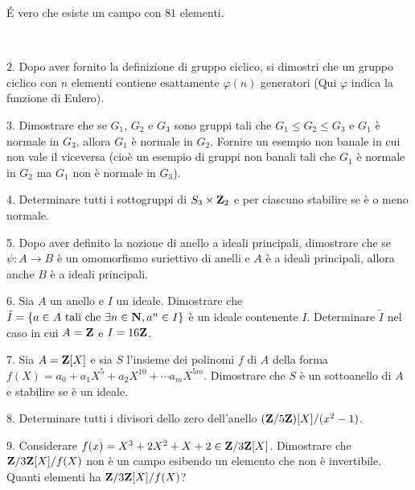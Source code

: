  \'E vero che esiste un campo con $81$ elementi.\medskip\bigskip\bigskip

\ \dotfill\ \bigskip\bigskip\bigskip


\vfil\eject

\item{2.} Dopo aver fornito la definizione di gruppo ciclico, si dimostri che un gruppo ciclico con $n$ elementi
contiene esattamente $\varphi(n)$ generatori (Qui $\varphi$ indica la funzione di Eulero).\vv

\item{3.} Dimostrare che se $G_1$, $G_2$ e $G_3$ sono gruppi tali che $G_1\le G_2\le G_3$ e $G_1$ \`e normale
in $G_3$, allora $G_1$ \`e normale in $G_2$. Fornire un esempio non banale in cui non vale il viceversa (cio\`e un
esempio di gruppi non banali tali che $G_1$ \`e normale in $G_2$ ma $G_1$ non \`e normale in $G_3$).\ve\vs

\item{4.} Determinare tutti i sottogruppi di $S_3\times {\bf Z}_2$ e per ciascuno stabilire se \`e o meno
normale.\vv

\item{5.} Dopo aver definito la nozione di anello a ideali principali, dimostrare che se $\psi: A\rightarrow B$
\`e un omomorfismo suriettivo di anelli e $A$ \`e a ideali principali, allora anche $B$ \`e a ideali
principali.\ve\vs

\item{6.} Sia $A$ un anello e $I$ un ideale. Dimostrare che $\tilde I=\{a\in A\ {\rm tali\ che\ } \exists n\in{\bf N}, a^n\in I\}$
\`e un ideale contenente $I$. Determinare $\tilde I$ nel caso in cui $A={\bf Z}$ e $I=16{\bf Z}$. 
\vv

\item{7.} Sia $A={\bf Z}[X]$ e sia $S$ l'insieme dei polinomi $f$ di $A$ della forma $f(X)=a_0+a_1X^5+a_2X^{10}+\cdots a_mX^{5m}$.
Dimostrare che $S$ \`e un sottoanello di $A$ e stabilire se \`e un ideale.\vv


\item{8.} Determinare tutti i divisori dello zero dell'anello  $({\bf Z}/5{\bf Z})[X]/(x^2-1)$.
\ve \vs

 \bye

\item{9.} Considerare $f(x)=X^3+2X^2+X+2\in{\bf Z}/3{\bf Z}[X]$. Dimostrare che ${\bf Z}/3{\bf Z}[X]/f(X)$
non \`e un campo esibendo un elemento che non \`e invertibile. Quanti elementi ha ${\bf Z}/3{\bf Z}[X]/f(X)$?
\ \vst
